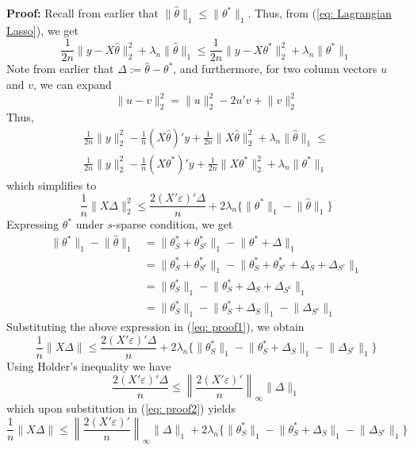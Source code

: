 \documentclass[10pt,handout,english]{beamer}
\begin{document}
\begin{frame}[allowframebreaks]
\noindent\textbf{Proof:} Recall from earlier that $\lVert \hat{\theta} \rVert_1\leq \lVert\theta^*\rVert_1$. Thus, from (\ref{eq: Lagrangian Lasso}), we get
\[
\frac{1}{2n}\lVert y-X\hat{\theta}\rVert_2^2+\lambda_n\lVert\hat{\theta}\rVert_1\leq \frac{1}{2n}\lVert y-X\theta^*\rVert_2^2+\lambda_n\lVert\theta^*\rVert_1
\]
Note from earlier that $\Delta:=\hat{\theta}-\theta^*$, and furthermore, for two column vectors $u$ and $v$, we can expand 
\[
\lVert u-v\rVert_2^2=\lVert u\rVert_2^2-2u'v+\lVert v\rVert_2^2
\]
Thus,
\begin{align*}
\frac{1}{2n}\lVert y\rVert_2^2-\frac{1}{n}(X\hat{\theta})'y+\frac{1}{2n}\lVert X\hat{\theta}\rVert_2^2+\lambda_n\lVert\hat{\theta}\rVert_1\leq\\
\frac{1}{2n}\lVert y\rVert_2^2-\frac{1}{n}(X\theta^*)'y+\frac{1}{2n}\lVert X\theta^*\rVert_2^2+\lambda_n\lVert\theta^*\rVert_1
\end{align*}
which simplifies to
\begin{equation}\label{eq: proof1}
\frac{1}{n}\lVert X\Delta\rVert_2^2\leq\frac{2(X'\varepsilon)'\Delta}{n}+2\lambda_n\{\lVert\theta^*\rVert_1-\lVert\hat{\theta}\rVert_1\}
\end{equation}
Expressing $\theta^*$ under $s$-sparse condition, we get
\begingroup
\allowdisplaybreaks
\begin{align*}
\lVert\theta^*\rVert_1-\lVert\hat{\theta}\rVert_1&=\lVert\theta_S^*+\theta_{S^c}^*\rVert_1-\lVert\theta^*+\Delta\rVert_1\\
&=\lVert\theta_S^*+\theta_{S^c}^*\rVert_1-\lVert\theta_S^*+\theta_{S^c}^*+\Delta_S+\Delta_{S^c}\rVert_1\\
&=\lVert\theta_S^*\rVert_1-\lVert\theta_S^*+\Delta_S+\Delta_{S^c}\rVert_1\\
&=\lVert\theta_S^*\rVert_1-\lVert\theta_S^*+\Delta_S\rVert_1-\lVert\Delta_{S^c}\rVert_1
\end{align*}
\endgroup
Substituting the above expression in (\ref{eq: proof1}), we obtain 
\begin{equation}\label{eq: proof2}
\frac{1}{n}\lVert X\Delta\rVert\leq\frac{2(X'\varepsilon)'\Delta}{n}+2\lambda_n\{\lVert\theta_S^*\rVert_1-\lVert\theta_S^*+\Delta_S\rVert_1-\lVert\Delta_{S^c}\rVert_1\}
\end{equation}
Using Holder's inequality we have
\[
\frac{2(X'\varepsilon)'\Delta}{n}\leq \left\lVert\frac{2(X'\varepsilon)'}{n}\right\rVert_{\infty}\lVert\Delta\rVert_1
\]
which upon substitution in (\ref{eq: proof2}) yields
\begin{equation}\label{eq: proof3}
\frac{1}{n}\lVert X\Delta\rVert\leq\left\lVert\frac{2(X'\varepsilon)'}{n}\right\rVert_{\infty}\lVert\Delta\rVert_1+2\lambda_n\{\lVert\theta_S^*\rVert_1-\lVert\theta_S^*+\Delta_S\rVert_1-\lVert\Delta_{S^c}\rVert_1\}
\end{equation}


\end{frame}
\end{document}
